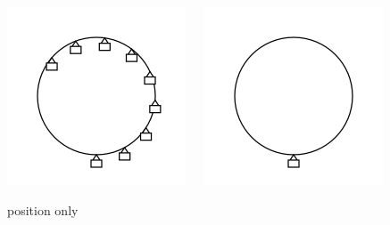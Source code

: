 \documentclass[compress]{beamer}
\begin{document}
\begin{frame}
\begin{itemize}
\begin{columns}
\begin{center}
\includegraphics[width=\linewidth]{Version2Announcement_ferris3.png}

position only
\end{center}

\begin{center}
\includegraphics[width=\linewidth]{Version2Announcement_ferris1.png}


\end{center}
\end{columns}
\end{itemize}
\end{frame}
\end{document}
